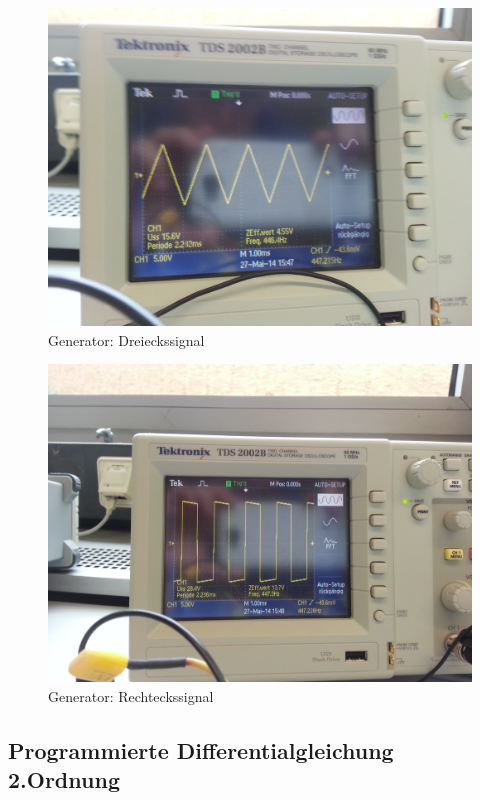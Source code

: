 \documentclass[a4paper,titlepage]{scrartcl}
\numberwithin{equation}{section}
\begin{document}
\begin{figure}[H]
\centering
\includegraphics[scale=.08]{bilder/aufgabe_4_2_1.jpg} 
\caption{Generator: Dreieckssignal}
\end{figure}

\begin{figure}[H]
\centering
\includegraphics[scale=.08]{bilder/aufgabe_4_2_2.jpg} 
\caption{Generator: Rechteckssignal}
\end{figure}

\subsection{Programmierte Differentialgleichung 2.Ordnung}
\end{document}
